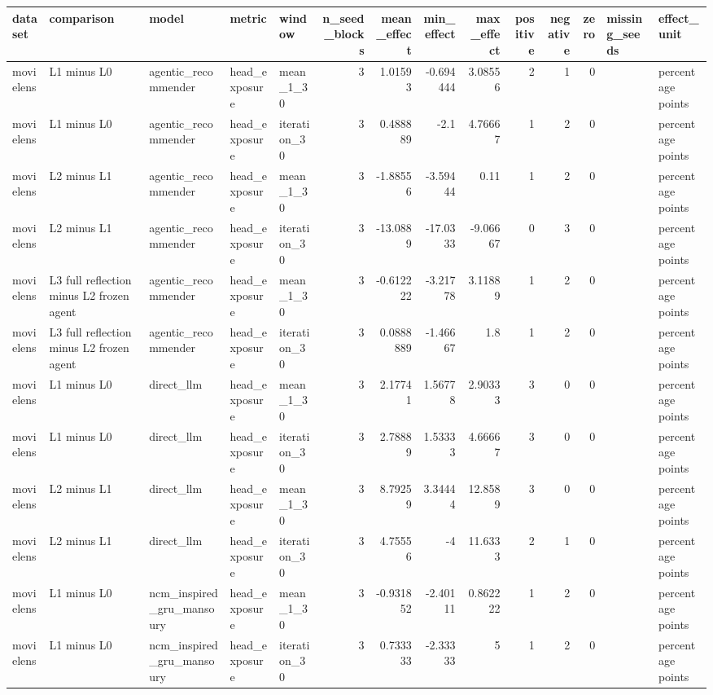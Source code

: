 \begin{table}[htbp!]
\centering
\small
\setlength{\tabcolsep}{3pt}
\renewcommand{\arraystretch}{1.1}
\begin{tabular}{lllllrrrrrrrll}
\hline
dataset & comparison & model & metric & window & n\_seed\_blocks & mean\_effect & min\_effect & max\_effect & positive & negative & zero & missing\_seeds & effect\_unit \\
\hline
movielens & L1 minus L0 & agentic\_recommender & head\_exposure & mean\_1\_30 & 3 & 1.01593 & -0.694444 & 3.08556 & 2 & 1 & 0 &  & percentage points \\
movielens & L1 minus L0 & agentic\_recommender & head\_exposure & iteration\_30 & 3 & 0.488889 & -2.1 & 4.76667 & 1 & 2 & 0 &  & percentage points \\
movielens & L2 minus L1 & agentic\_recommender & head\_exposure & mean\_1\_30 & 3 & -1.88556 & -3.59444 & 0.11 & 1 & 2 & 0 &  & percentage points \\
movielens & L2 minus L1 & agentic\_recommender & head\_exposure & iteration\_30 & 3 & -13.0889 & -17.0333 & -9.06667 & 0 & 3 & 0 &  & percentage points \\
movielens & L3 full reflection minus L2 frozen agent & agentic\_recommender & head\_exposure & mean\_1\_30 & 3 & -0.612222 & -3.21778 & 3.11889 & 1 & 2 & 0 &  & percentage points \\
movielens & L3 full reflection minus L2 frozen agent & agentic\_recommender & head\_exposure & iteration\_30 & 3 & 0.0888889 & -1.46667 & 1.8 & 1 & 2 & 0 &  & percentage points \\
movielens & L1 minus L0 & direct\_llm & head\_exposure & mean\_1\_30 & 3 & 2.17741 & 1.56778 & 2.90333 & 3 & 0 & 0 &  & percentage points \\
movielens & L1 minus L0 & direct\_llm & head\_exposure & iteration\_30 & 3 & 2.78889 & 1.53333 & 4.66667 & 3 & 0 & 0 &  & percentage points \\
movielens & L2 minus L1 & direct\_llm & head\_exposure & mean\_1\_30 & 3 & 8.79259 & 3.34444 & 12.8589 & 3 & 0 & 0 &  & percentage points \\
movielens & L2 minus L1 & direct\_llm & head\_exposure & iteration\_30 & 3 & 4.75556 & -4 & 11.6333 & 2 & 1 & 0 &  & percentage points \\
movielens & L1 minus L0 & ncm\_inspired\_gru\_mansoury & head\_exposure & mean\_1\_30 & 3 & -0.931852 & -2.40111 & 0.862222 & 1 & 2 & 0 &  & percentage points \\
movielens & L1 minus L0 & ncm\_inspired\_gru\_mansoury & head\_exposure & iteration\_30 & 3 & 0.733333 & -2.33333 & 5 & 1 & 2 & 0 &  & percentage points \\

\end{tabular}
\end{table}
